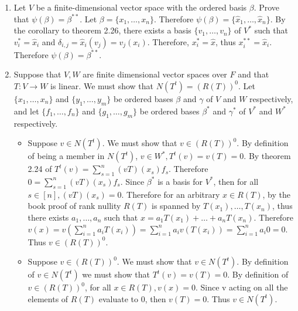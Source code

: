 \documentclass[12pt, letterpaper]{article}
\begin{document}
\begin{enumerate}
		
		\newpage
		\item Let $V$ be a finite-dimensional vector space with the ordered basis $\beta$.  Prove that $\psi(\beta) = \beta^{**}$.
			Let $\beta = \{x_1,\ldots,x_n\}$.  Therefore $\psi (\beta) = \{\hat{x}_1,\ldots,\hat{x}_n\}$.  By the corollary to theorem 2.26, there exists a basis $\{v_1,\ldots,v_n\}$ of $V^*$ such that $v^*_i = \hat{x}_i$ and $\delta_{i,j} = \hat{x}_i (v_j) = v_j(x_i)$.    Therefore, $x_i^* = \hat{x}$, thus $x_i^{**} = \hat{x}_i$. Therefore $\psi(\beta) = \beta^{**}$.
		\newpage
		
		\item Suppose that $V,W$ are finite dimensional vector spaces over $F$ and that $T: V \to W$ is linear.  We must show that $N(T^t) = (R(T))^0$.  Let $\{x_1,\ldots,x_n\}$ and $\{y_1,\ldots,y_m\}$ be ordered bases $\beta$ and $\gamma$ of $V$ and $W$ respectively, and let $\{f_1,\ldots,f_n\}$ and $\{g_1,\ldots,g_m\}$ be ordered bases $\beta^*$ and $\gamma^*$ of $V^*$ and $W^*$ respectively.    
		\begin{itemize}
			\item Suppose $v \in N(T^t)$.  We must show that $v \in (R(T))^0$.  By definition of being a member in $N(T^t)$, $v \in W^*, T^t (v) = v(T) = 0$.  By theorem 2.24 of $T^t (v) = \sum_{s = 1}^n (v T)(x_s) f_s$.  Therefore $0 = \sum_{s = 1}^n (v T)(x_s) f_s$.  Since $\beta^*$ is a basis for $V^*$, then for all $s \in [n], (v T)(x_s) = 0$.  Therefore for an arbitrary $x \in R(T)$, by the book proof of rank nullity $R(T)$ is spanned by $T(x_1),\ldots, T(x_n)$, thus there exists $a_1,\ldots, a_n$ such that  $x = a_1 T(x_1) + \ldots + a_n T(x_n)$.  Therefore $v(x) = v(\sum_{i=1}^n a_i T(x_i)) = \sum_{i=1}^n a_i v(T(x_i)) = \sum_{i=1}^n a_i 0 = 0$.  Thus $v \in (R(T))^0$.
			\item Suppose $v \in (R(T))^0 $.  We must show that $v \in N(T^t)$.  By definition of $v \in N(T^t)$ we must show that $T^t (v) = v(T) = 0$.  By definition of $v \in (R(T))^0$, for all $x \in R(T), v(x) = 0$.  Since v acting on all the elements of $R(T)$ evaluate to 0, then $v(T) = 0$.  Thus $v \in N(T^t)$.
			
\end{itemize}		 
	\end{enumerate}
\end{document}
